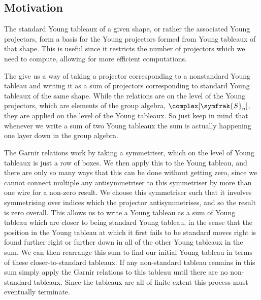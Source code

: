 \documentclass[fleqn]{NotesClass}
\newcommand{\symmetricGroup}[1][n]{\symfrak{S}_{#1}}
\begin{document}
    \subsection{Motivation}
    The standard Young tableaux of a given shape, or rather the associated Young projectors, form a basis for the Young projectors formed from Young tableaux of that shape.
    This is useful since it restricts the number of projectors which we need to compute, allowing for more efficient computations.
    
    The  give us a way of taking a projector corresponding to a nonstandard Young tableau and writing it as a sum of projectors corresponding to standard Young tableaux of the same shape.
    While the relations are on the level of the Young projectors, which are elements of the group algebra, \(\complex[\symmetricGroup]\), they are applied on the level of the Young tableaux.
    So just keep in mind that whenever we write a sum of two Young tableaux the sum is actually happening one layer down in the group algebra.
    
    The Garnir relations work by taking a symmetriser, which on the level of Young tableaux is just a row of boxes.
    We then apply this to the Young tableau, and there are only so many ways that this can be done without getting zero, since we cannot connect multiple any antisymmetriser to this symmetriser by more than one wire for a non-zero result.
    We choose this symmetriser such that it involves symmetrising over indices which the projector antisymmetrises, and so the result is zero overall.
    This allows us to write a Young tableau as a sum of Young tableau which are closer to being standard Young tableau, in the sense that the position in the Young tableau at which it first fails to be standard moves right is found further right or further down in all of the other Young tableaux in the sum.
    We can then rearrange this sum to find our initial Young tableau in terms of these closer-to-standard tableaux.
    If any non-standard tableau remains in this sum simply apply the Garnir relations to this tableau until there are no non-standard tableaux.
    Since the tableaux are all of finite extent this process must eventually terminate.
    
\end{document}
